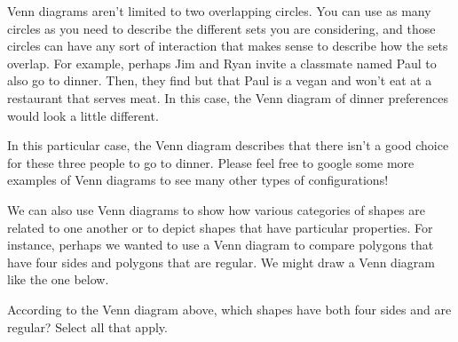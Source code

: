 \documentclass{ximera}
\begin{document}
Venn diagrams aren't limited to two overlapping circles. You can use as many circles as you need to describe the different sets you are considering, and those circles can have any sort of interaction that makes sense to describe how the sets overlap. For example, perhaps Jim and Ryan invite a classmate named Paul to also go to dinner. Then, they find but that Paul is a vegan and won't eat at a restaurant that serves meat. In this case, the Venn diagram of dinner preferences would look a little different.
\begin{center}
\end{center}
In this particular case, the Venn diagram describes that there isn't a good choice for these three people to go to dinner. Please feel free to google some more examples of Venn diagrams to see many other types of configurations!

We can also use Venn diagrams to show how various categories of shapes are related to one another or to depict shapes that have particular properties. For instance, perhaps we wanted to use a Venn diagram to compare polygons that have four sides and polygons that are regular. We might draw a Venn diagram like the one below.

\begin{center}
\end{center}

\begin{question}
According to the Venn diagram above, which shapes have both four sides and are regular? Select all that apply.
\begin{selectAll}
\end{selectAll}
\end{question}
\end{document}
